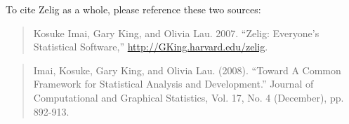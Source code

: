 To cite Zelig as a whole, please reference these two sources:
\begin{verse}
  Kosuke Imai, Gary King, and Olivia Lau. 2007. ``Zelig: Everyone's
  Statistical Software,'' \url{http://GKing.harvard.edu/zelig}.
\end{verse}
\begin{verse}
Imai, Kosuke, Gary King, and Olivia Lau. (2008). ``Toward A Common Framework for Statistical Analysis and Development.'' Journal of Computational and Graphical Statistics, Vol. 17, No. 4 (December), pp. 892-913. 
\end{verse}
